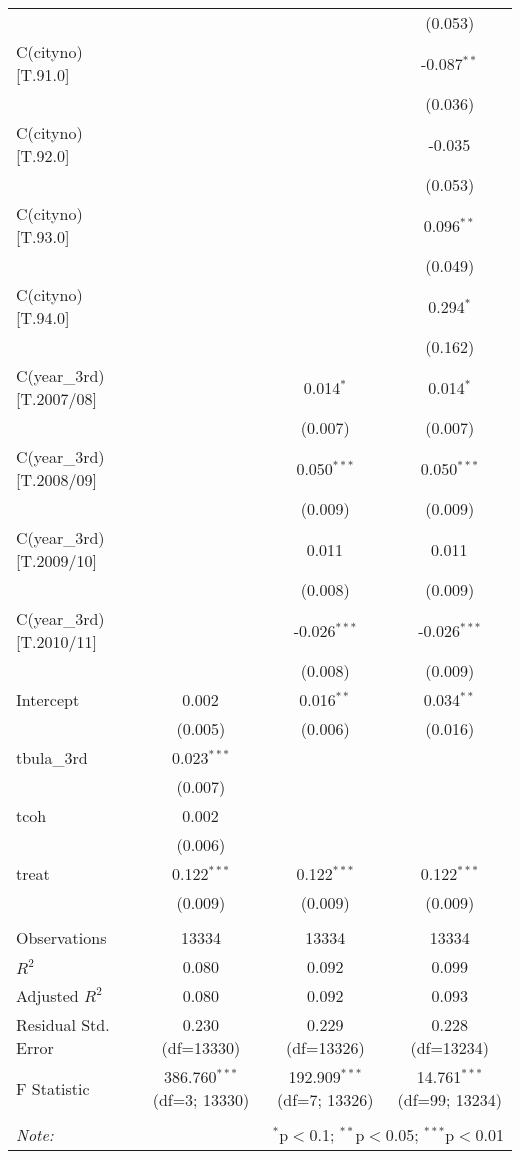 \begin{table}[!htbp]
\begin{tabular}{@{\extracolsep{5pt}}lccc}
& & & (0.053) \\
 C(cityno)[T.91.0] & & & -0.087$^{**}$ \\
& & & (0.036) \\
 C(cityno)[T.92.0] & & & -0.035$^{}$ \\
& & & (0.053) \\
 C(cityno)[T.93.0] & & & 0.096$^{**}$ \\
& & & (0.049) \\
 C(cityno)[T.94.0] & & & 0.294$^{*}$ \\
& & & (0.162) \\
 C(year_3rd)[T.2007/08] & & 0.014$^{*}$ & 0.014$^{*}$ \\
& & (0.007) & (0.007) \\
 C(year_3rd)[T.2008/09] & & 0.050$^{***}$ & 0.050$^{***}$ \\
& & (0.009) & (0.009) \\
 C(year_3rd)[T.2009/10] & & 0.011$^{}$ & 0.011$^{}$ \\
& & (0.008) & (0.009) \\
 C(year_3rd)[T.2010/11] & & -0.026$^{***}$ & -0.026$^{***}$ \\
& & (0.008) & (0.009) \\
 Intercept & 0.002$^{}$ & 0.016$^{**}$ & 0.034$^{**}$ \\
& (0.005) & (0.006) & (0.016) \\
 tbula_3rd & 0.023$^{***}$ & & \\
& (0.007) & & \\
 tcoh & 0.002$^{}$ & & \\
& (0.006) & & \\
 treat & 0.122$^{***}$ & 0.122$^{***}$ & 0.122$^{***}$ \\
& (0.009) & (0.009) & (0.009) \\
\hline \\[-1.8ex]
 Observations & 13334 & 13334 & 13334 \\
 $R^2$ & 0.080 & 0.092 & 0.099 \\
 Adjusted $R^2$ & 0.080 & 0.092 & 0.093 \\
 Residual Std. Error & 0.230 (df=13330) & 0.229 (df=13326) & 0.228 (df=13234) \\
 F Statistic & 386.760$^{***}$ (df=3; 13330) & 192.909$^{***}$ (df=7; 13326) & 14.761$^{***}$ (df=99; 13234) \\
\hline
\hline \\[-1.8ex]
\textit{Note:} & \multicolumn{3}{r}{$^{*}$p$<$0.1; $^{**}$p$<$0.05; $^{***}$p$<$0.01} \\
\end{tabular}
\end{table}

